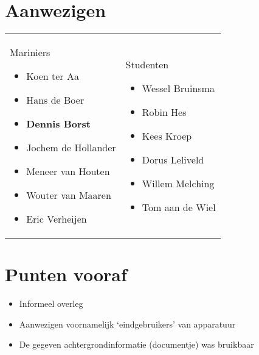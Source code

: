 \documentclass[12pt, a4paper]{article}
\date{\displaydate{date}}
\begin{document}
\section{Aanwezigen}
\begin{tabular}{p{}p{}}
    Mariniers
    \begin{itemize}
        \item Koen ter Aa
        \item Hans de Boer
        \item \textbf{Dennis Borst}
        \item Jochem de Hollander
        \item Meneer van Houten
        \item Wouter van Maaren
        \item Eric Verheijen
    \end{itemize} &

    Studenten
    \begin{itemize}
        \item Wessel Bruinsma
        \item Robin Hes
        \item Kees Kroep
        \item Dorus Leliveld
        \item Willem Melching
        \item Tom aan de Wiel
    \end{itemize} \\
\end{tabular}


\section{Punten vooraf}
\begin{itemize}
  \item Informeel overleg
  \item Aanwezigen voornamelijk `eindgebruikers' van apparatuur
  \item De gegeven achtergrondinformatie (documentje) was bruikbaar
\end{itemize}
\end{document}

